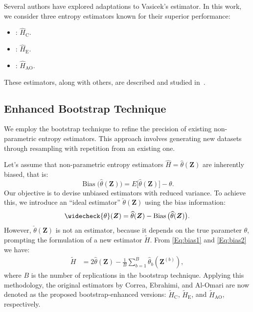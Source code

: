 \documentclass[conference,final,]{IEEEtran}
\begin{document}
Several authors have explored adaptations to Vasicek's estimator. In
this work, we consider three entropy estimators known for their superior
performance:

\begin{itemize}
\item
  \cite{correa1995new}: \(\widehat{H}_{\text{C}}\).
\item
  \cite{Ebrahimi1994}: \(\widehat{H}_{\mathrm{E}}\).
\item
  \cite{IbrahimAlOmari2014}: \(\widehat{H}_{\mathrm{AO}}\).
\end{itemize}

These estimators, along with others, are described and studied
in~\cite{Cassetti2022}.

\hypertarget{enhanced-bootstrap-technique}{%
\subsection{Enhanced Bootstrap
Technique}\label{enhanced-bootstrap-technique}}

We employ the bootstrap technique to refine the precision of existing
non-parametric entropy estimators. This approach involves generating new
datasets through resampling with repetition from an existing one.

Let's assume that non-parametric entropy estimators
\(\widehat{H}=\widehat{\theta}(\bm{Z})\) are inherently biased, that is:
\begin{equation}
\label{Eq:bias1}
\operatorname{Bias}\big(\widehat{\theta}(\bm{Z})\big) = E\big[\widehat{\theta}(\bm{Z})\big] - \theta.
\end{equation} Our objective is to devise unbiased estimators with
reduced variance. To achieve this, we introduce an ``ideal estimator''
\(\check{\theta}(\bm{Z})\) using the bias information: \begin{equation}
\label{Eq:bias2}
\widecheck{\theta}(\bm{Z}) = \widehat{\theta}(\bm{Z}) - \operatorname{Bias}\big(\widehat{\theta}(\bm{Z})\big).
\end{equation} However, \(\check{\theta}(\bm{Z})\) is not an estimator,
because it depends on the true parameter \(\theta\), prompting the
formulation of a new estimator \(\widetilde{H}\). From \eqref{Eq:bias1}
and \eqref{Eq:bias2} we have: \begin{align*}
\widetilde{H} &= 2\widehat{\theta}(\bm{Z}) - \frac{1}{B}\sum_{b=1}^B \widehat{\theta}_b(\bm{Z}^{(b)}),
\end{align*} where \(B\) is the number of replications in the bootstrap
technique. Applying this methodology, the original estimators by Correa,
Ebrahimi, and Al-Omari are now denoted as the proposed
bootstrap-enhanced versions: \(\widetilde{H}_{\text{C}}\),
\(\widetilde{H}_{\text{E}}\), and \(\widetilde{H}_{\text{AO}}\),
respectively.
\end{document}
